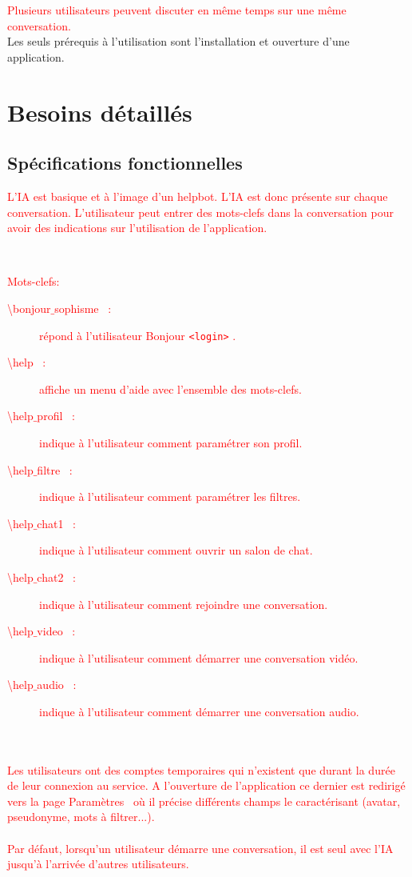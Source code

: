 \documentclass[11pt,dvipsnames,svgnames]{report}
\begin{document}
\textcolor{red}{Plusieurs utilisateurs peuvent discuter en même temps sur une même conversation.}\\

Les seuls prérequis à l'utilisation sont l'installation et ouverture d'une application.

\section{Besoins détaillés}

\subsection{Spécifications fonctionnelles}

\textcolor{red}{L'IA est basique et à l'image d'un helpbot. L'IA est donc présente sur chaque conversation. L'utilisateur peut entrer des mots-clefs dans la conversation pour avoir des indications sur l'utilisation de l'application. }

~\\
\textcolor{red}{ Mots-clefs:
\begin{description}
\item[\og \textbackslash bonjour$\_$sophisme \fg\ :] répond à l'utilisateur \og Bonjour \texttt{<login>} \fg.
\item[\og \textbackslash help \fg\ :] affiche un menu d'aide avec l'ensemble des mots-clefs.
\item[\og \textbackslash help$\_$profil \fg\ :] indique à l'utilisateur comment paramétrer son profil.
\item[\og \textbackslash help$\_$filtre \fg\ :] indique à l'utilisateur comment paramétrer les filtres.
\item[\og \textbackslash help$\_$chat1 \fg\ :] indique à l'utilisateur comment ouvrir un salon de chat.
\item[\og \textbackslash help$\_$chat2 \fg\ :] indique à l'utilisateur comment rejoindre une conversation.
\item[\og \textbackslash help$\_$video \fg\ :] indique à l'utilisateur comment démarrer une conversation vidéo.
\item[\og \textbackslash help$\_$audio \fg\ :] indique à l'utilisateur comment démarrer une conversation audio.
\end{description}
}

~\\\\
\textcolor{red}{	Les utilisateurs ont des comptes temporaires qui n'existent que durant la durée de leur connexion au service. A l'ouverture de l'application ce dernier est redirigé vers la page \og Paramètres \fg\ où il précise différents champs le caractérisant (avatar, pseudonyme, mots à filtrer...).}
~\\\\
\textcolor{red}{Par défaut, lorsqu'un utilisateur démarre une conversation, il est seul avec l'IA jusqu'à l'arrivée d'autres utilisateurs.}
\end{document}
